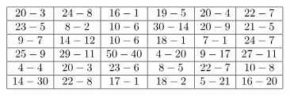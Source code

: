 \centerline{}
\renewcommand{\arraystretch}{1.5}
\[\begin{array}{|c|c|c|c|c|c|}
  \hline
   20-3 & 24-8 & 16-1 & 19-5 & 20-4 & 22-7 \\
  \hline
   23-5 & 8-2 & 10-6 & 30-14 & 20-9 & 21-5 \\
  \hline
   9-7 & 14-12 & 10-6 & 18-1 & 7-1 & 24-7 \\
  \hline
   25-9 & 29-11 & 50-40 & 4-20 & 9-17 & 27-11 \\
  \hline
   4-4 & 20-3 & 23-6 & 8-5 & 22-7 & 10-8 \\
  \hline
   14-30 & 22-8 & 17-1 & 18-2 & 5-21 & 16-20 \\
  \hline
\end{array}\]
\renewcommand{\arraystretch}{1}
